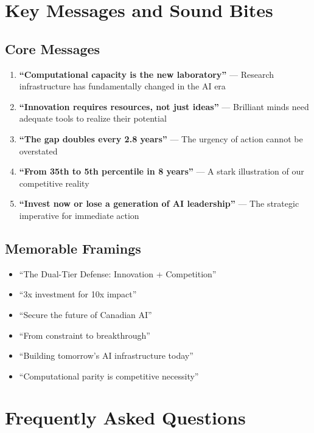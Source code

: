 \documentclass{article}
\begin{document}
\section{Key Messages and Sound Bites}

\subsection{Core Messages}

\begin{enumerate}
\item \textbf{``Computational capacity is the new laboratory''} --- Research infrastructure has fundamentally changed in the AI era
   
\item \textbf{``Innovation requires resources, not just ideas''} --- Brilliant minds need adequate tools to realize their potential

\item \textbf{``The gap doubles every 2.8 years''} --- The urgency of action cannot be overstated

\item \textbf{``From 35th to 5th percentile in 8 years''} --- A stark illustration of our competitive reality

\item \textbf{``Invest now or lose a generation of AI leadership''} --- The strategic imperative for immediate action
\end{enumerate}

\subsection{Memorable Framings}

\begin{itemize}
\item ``The Dual-Tier Defense: Innovation + Competition''
\item ``3x investment for 10x impact''
\item ``Secure the future of Canadian AI''
\item ``From constraint to breakthrough''
\item ``Building tomorrow's AI infrastructure today''
\item ``Computational parity is competitive necessity''
\end{itemize}

\section{Frequently Asked Questions}
\end{document}
